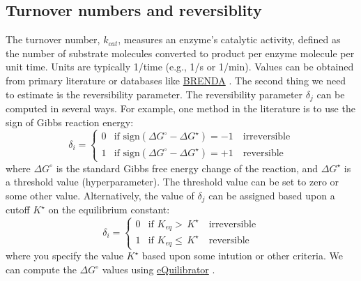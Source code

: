 \documentclass{article}[11pt]
\begin{document}
\subsection{Turnover numbers and reversiblity}
The turnover number, $k_{cat}$, measures an enzyme's catalytic activity, defined as the number of substrate molecules converted to product per enzyme molecule per unit time. Units are typically 1/time (e.g., 1/s or 1/min). 
Values can be obtained from primary literature or databases like \href{https://www.brenda-enzymes.org/}{BRENDA} \citep{BRENDA2021}.
The second thing we need to estimate is the reversibility parameter.
The reversibility parameter $\delta_{j}$ can be computed in several ways. For example, one method in the literature is to use the sign of Gibbs reaction energy:
\begin{equation*}
\delta_{i} = \begin{cases}
0 & \text{if }\text{sign}\left(\Delta{G}^{\circ} - \Delta{G}^{\star}\right)= -1 \quad\text{irreversible} \\
1 & \text{if }\text{sign}\left(\Delta{G}^{\circ} - \Delta{G}^{\star}\right)= +1 \quad\text{reversible}
\end{cases}
\end{equation*}
where $\Delta{G}^{\circ}$ is the standard Gibbs free energy change of the reaction, and $\Delta{G}^{\star}$ is a threshold value (hyperparameter). 
The threshold value can be set to zero or some other value. Alternatively, the value of $\delta_{j}$ can be assigned based upon a cutoff $K^{\star}$ on the equilibrium constant:
\begin{equation*}
\delta_{i} = \begin{cases}
0 & \text{if }K_{eq}>\,K^{\star}\quad\text{irreversible} \\
1 & \text{if }K_{eq}\leq\,K^{\star}\quad\text{reversible}
\end{cases}
\end{equation*}
where you specify the value $K^{\star}$ based upon some intution or other criteria. We can compute the $\Delta{G}^{\circ}$ values using \href{ttps://equilibrator.weizmann.ac.il}{eQuilibrator} \citep{Beber:2022aa}.


\end{document}
